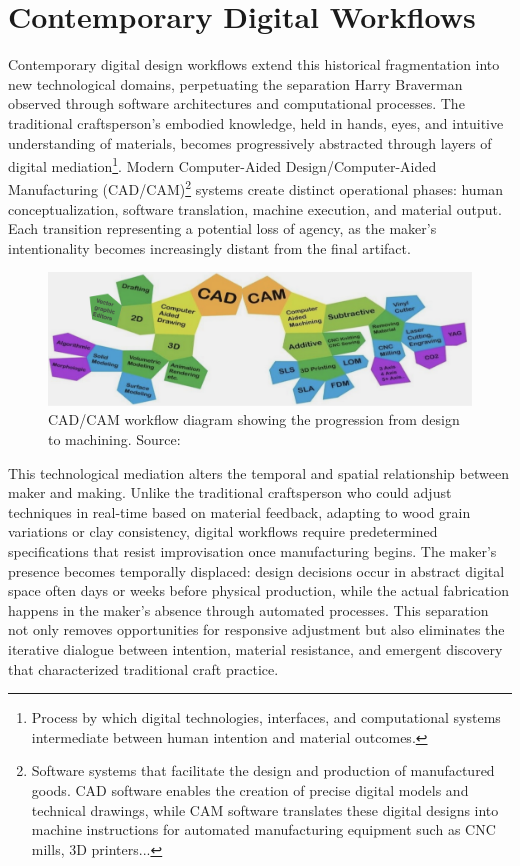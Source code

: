 \section{Contemporary Digital Workflows}

Contemporary digital design workflows extend this historical fragmentation into new technological domains, perpetuating the separation Harry Braverman observed through software architectures and computational processes. The traditional craftsperson's embodied knowledge, held in hands, eyes, and intuitive understanding of materials, becomes progressively abstracted through layers of digital mediation\footnote{Process by which digital technologies, interfaces, and computational systems intermediate between human intention and material outcomes.}. Modern Computer-Aided Design/Computer-Aided Manufacturing (CAD/CAM)\footnote{Software systems that facilitate the design and production of manufactured goods. CAD software enables the creation of precise digital models and technical drawings, while CAM software translates these digital designs into machine instructions for automated manufacturing equipment such as CNC mills, 3D printers...} systems create distinct operational phases: human conceptualization, software translation, machine execution, and material output. Each transition representing a potential loss of agency, as the maker's intentionality becomes increasingly distant from the final artifact.

\begin{figure}[H]
\centering
\includegraphics[width=1\textwidth]{figures/chapter1/CAD-CAM.png}
\caption{CAD/CAM workflow diagram showing the progression from design to machining. Source: \citet{santifu2024}}
\label{fig:cad_cam_workflow}
\end{figure}

This technological mediation alters the temporal and spatial relationship between maker and making. Unlike the traditional craftsperson who could adjust techniques in real-time based on material feedback, adapting to wood grain variations or clay consistency, digital workflows require predetermined specifications that resist improvisation once manufacturing begins. The maker's presence becomes temporally displaced: design decisions occur in abstract digital space often days or weeks before physical production, while the actual fabrication happens in the maker's absence through automated processes. This separation not only removes opportunities for responsive adjustment but also eliminates the iterative dialogue between intention, material resistance, and emergent discovery that characterized traditional craft practice.

